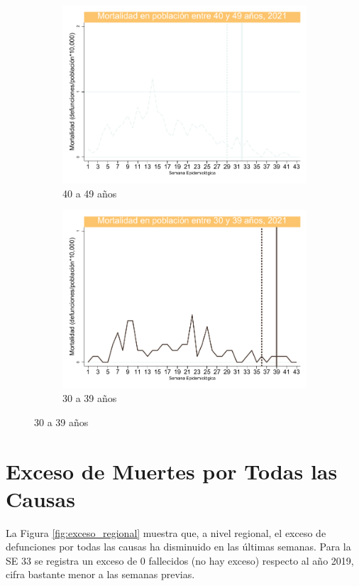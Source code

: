 \documentclass[12pt,a4paper,openany]{book}
\begin{document}
\begin{figure}[h]
	\vspace{10mm}
	\begin{subfigure}[b]{0.45\textwidth}
		\centering
		\includegraphics[width=\textwidth]{../figuras/mortalidad_edad_40.pdf}
		\caption{40 a 49 años}
	\end{subfigure}
	\hfill
	\begin{subfigure}[b]{0.45\textwidth}
		\centering
		\includegraphics[width=\textwidth]{../figuras/mortalidad_edad_30.pdf}
		\caption{30 a 39 años}
	\end{subfigure}
	\end{figure}

\clearpage
	
	\section*{Exceso de Muertes por Todas las Causas}
	\noindent  La Figura \ref{fig:exceso_regional} muestra que, a nivel regional, el exceso de defunciones por todas las causas ha disminuido en las últimas semanas. Para la SE 33 se registra un exceso de 0 fallecidos (no hay exceso) respecto al año 2019, cifra bastante menor a las semanas previas.
\end{document}
